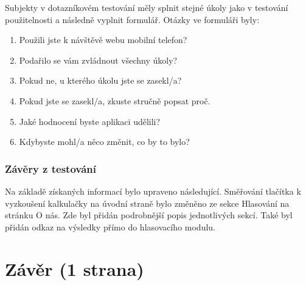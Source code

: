 \par Subjekty v dotazníkovém testování měly splnit stejné úkoly jako v testování použitelnosti a následně vyplnit formulář. Otázky ve formuláři byly:
\begin{enumerate}
    \item Použili jste k návštěvě webu mobilní telefon?
    \item Podařilo se vám zvládnout všechny úkoly?
    \item Pokud ne, u kterého úkolu jste se zasekl/a?
    \item Pokud jste se zasekl/a, zkuste stručně popsat proč.
    \item Jaké hodnocení byste aplikaci udělili?
    \item Kdybyste mohl/a něco změnit, co by to bylo?
\end{enumerate}




\subsection{Závěry z testování} 
Na základě získaných informací bylo upraveno následující. Směřování tlačítka k vyzkoušení kalkulačky na úvodní straně bylo změněno ze sekce Hlasování na stránku O nás. Zde byl přidán podrobnější popis jednotlivých sekcí. Také byl přidán odkaz na výsledky přímo do hlasovacího modulu. 


\chapter{Závěr (1 strana)}
\label{chap:zaver}
